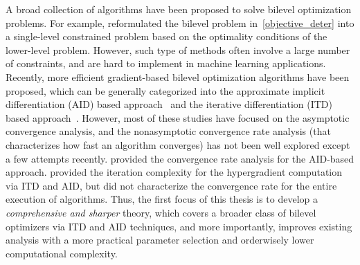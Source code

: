 \documentclass{osudissert96}
\begin{document}
A broad collection of algorithms have been proposed to solve bilevel optimization problems. For example, \cite{hansen1992new,shi2005extended,moore2010bilevel} reformulated the bilevel problem in~\cref{objective_deter} into a single-level constrained problem based on the optimality conditions of the lower-level problem. However, such type of methods often involve  a large number of constraints, and  are hard to implement in machine learning applications. Recently, more efficient gradient-based bilevel optimization algorithms have been proposed, which can be generally categorized into the approximate implicit differentiation (AID) based approach~\cite{domke2012generic,pedregosa2016hyperparameter,gould2016differentiating,liao2018reviving,ghadimi2018approximation,grazzi2020iteration,lorraine2020optimizing} and the iterative differentiation (ITD) based approach~\cite{domke2012generic,maclaurin2015gradient,franceschi2017forward,franceschi2018bilevel,shaban2019truncated,grazzi2020iteration}. However, most of these studies have focused on the asymptotic convergence analysis, and the nonasymptotic convergence rate analysis (that characterizes how fast an algorithm converges) has not been well explored except a few attempts recently. \cite{ghadimi2018approximation} provided the convergence rate analysis for the AID-based approach. \cite{grazzi2020iteration} provided the iteration complexity for the hypergradient computation via ITD and AID, but did not characterize the  convergence rate for the entire execution of algorithms. Thus, the first focus of this thesis is to develop a {\em comprehensive and sharper} theory, which covers a broader class of bilevel optimizers via ITD and AID techniques, and more importantly, improves existing  analysis with a more practical parameter selection and orderwisely lower computational complexity. 
\end{document}
